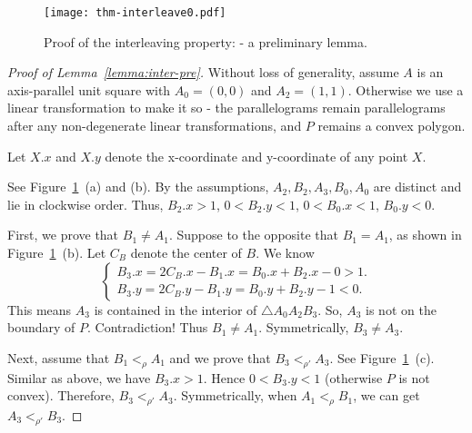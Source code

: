 \documentclass{ws-ijcga}
\begin{document}
\begin{figure}[h]
\centering\texttt{[image: thm-interleave0.pdf]}
\caption{Proof of the interleaving property: - a preliminary lemma.}\label{fig:interleave0}
\end{figure}

\begin{proof}[Proof of Lemma~\ref{lemma:inter-pre}]
Without loss of generality, assume $A$ is an axis-parallel unit square with $A_0=(0,0)$ and $A_2=(1,1)$.
Otherwise we use a linear transformation to make it so - the parallelograms remain parallelograms after any non-degenerate linear transformations, and $P$ remains a convex polygon.

Let $X.x$ and $X.y$ denote the x-coordinate and y-coordinate of any point $X$.

See Figure~\ref{fig:interleave0}~(a) and (b). By the assumptions, $A_2,B_2,A_3,B_0,A_0$ are distinct and lie in clockwise order.
Thus, $B_2.x > 1$, $0<B_2.y<1$, $0<B_0.x<1$, $B_0.y<0$.

First, we prove that $B_1\neq A_1$.
  Suppose to the opposite that $B_1=A_1$, as shown in Figure~\ref{fig:interleave0}~(b).
  Let $C_B$ denote the center of $B$.
  We know
  \begin{equation*}
    \left\{
    \begin{gathered}
       B_3.x=2C_B.x-B_1.x=B_0.x+B_2.x-0>1.\\
       B_3.y=2C_B.y-B_1.y=B_0.y+B_2.y-1<0.
    \end{gathered}\right.
  \end{equation*}
  This means $A_3$ is contained in the interior of $\triangle A_0A_2B_3$. So, $A_3$ is not on the boundary of $P$. Contradiction!
    Thus $B_1\neq A_1$. Symmetrically, $B_3\neq A_3$.\smallskip

  Next, assume that $B_1<_\rho A_1$ and we prove that $B_3<_{\rho'}A_3$. See Figure~\ref{fig:interleave0}~(c).
    Similar as above, we have $B_3.x>1$. Hence $0<B_3.y<1$ (otherwise $P$ is not convex).
      Therefore, $B_3<_{\rho'}A_3$.
      Symmetrically, when $A_1<_\rho B_1$, we can get $A_3<_{\rho'}B_3$.
 \end{proof}
\end{document}
